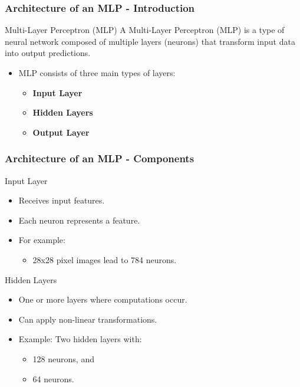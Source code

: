 \documentclass[aspectratio=169]{beamer}
\begin{document}
\begin{frame}[fragile]
    \frametitle{Architecture of an MLP - Introduction}
    \begin{block}{Multi-Layer Perceptron (MLP)}
        A Multi-Layer Perceptron (MLP) is a type of neural network composed of multiple layers (neurons) that transform input data into output predictions. 
    \end{block}
    
    \begin{itemize}
        \item MLP consists of three main types of layers:
            \begin{itemize}
                \item \textbf{Input Layer}
                \item \textbf{Hidden Layers}
                \item \textbf{Output Layer}
            \end{itemize}
    \end{itemize}
\end{frame}

\begin{frame}[fragile]
    \frametitle{Architecture of an MLP - Components}
    \begin{block}{Input Layer}
        \begin{itemize}
            \item Receives input features.
            \item Each neuron represents a feature.
            \item For example: 
              \begin{itemize}
                \item 28x28 pixel images lead to 784 neurons.
              \end{itemize}
        \end{itemize}
    \end{block}

    \begin{block}{Hidden Layers}
        \begin{itemize}
            \item One or more layers where computations occur.
            \item Can apply non-linear transformations.
            \item Example: Two hidden layers with:
              \begin{itemize}
                \item 128 neurons, and
                \item 64 neurons.
              \end{itemize}
        \end{itemize}
    \end{block}
    
\end{frame}
\end{document}
